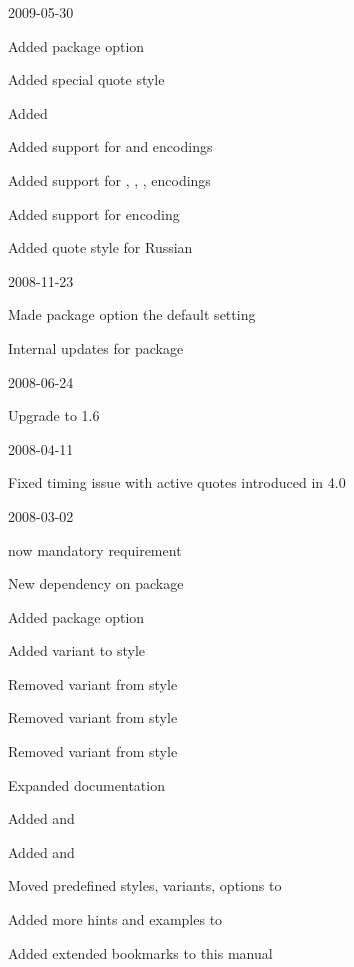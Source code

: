 \documentclass{ltxdockit}[2010/09/26]
\begin{document}
\begin{changelog}
\begin{release}{4.4}{2009-05-30}
\item Added package option 
\item Added special quote style 
\item Added 
\item Added support for  and  encodings
\item Added support for , , ,  encodings
\item Added support for  encoding
\item Added quote style for Russian
\end{release}

\begin{release}{4.3}{2008-11-23}
\item Made package option  the default setting
\item Internal updates for  package
\end{release}

\begin{release}{4.2}{2008-06-24}
\item Upgrade to  1.6
\end{release}

\begin{release}{4.1}{2008-04-11}
\item Fixed timing issue with active quotes introduced in 4.0
\end{release}

\begin{release}{4.0}{2008-03-02}
\item \etex now mandatory requirement
\item New dependency on  package
\item Added package option 
\item Added variant  to style 
\item Removed variant  from  style
\item Removed variant  from  style
\item Removed variant  from  style
\item Expanded documentation
\item Added  and 
\item Added  and 
\item Moved predefined styles, variants, options to 
\item Added more hints and examples to 
\item Added extended \pdf bookmarks to this manual
\end{release}


\end{changelog}
\end{document}
